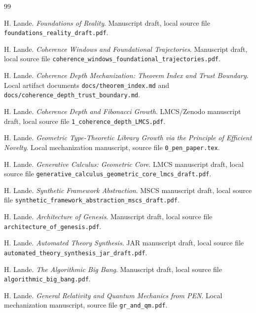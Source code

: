 \documentclass[11pt]{article}
\theoremstyle{plain}
\theoremstyle{definition}
\theoremstyle{remark}
\begin{document}
\begin{thebibliography}{99}
\raggedright

H. Lande.
\newblock \emph{Foundations of Reality}.
\newblock Manuscript draft, local source file \texttt{foundations\_reality\_draft.pdf}.

H. Lande.
\newblock \emph{Coherence Windows and Foundational Trajectories}.
\newblock Manuscript draft, local source file \texttt{coherence\_windows\_foundational\_trajectories.pdf}.

H. Lande.
\newblock \emph{Coherence Depth Mechanization: Theorem Index and Trust Boundary}.
\newblock Local artifact documents \texttt{docs/theorem\_index.md} and \texttt{docs/coherence\_depth\_trust\_boundary.md}.

H. Lande.
\newblock \emph{Coherence Depth and Fibonacci Growth}.
\newblock LMCS/Zenodo manuscript draft, local source file \texttt{1\_coherence\_depth\_LMCS.pdf}.

H. Lande.
\newblock \emph{Geometric Type-Theoretic Library Growth via the Principle of Efficient Novelty}.
\newblock Local mechanization manuscript, source file \texttt{0\_pen\_paper.tex}.

H. Lande.
\newblock \emph{Generative Calculus: Geometric Core}.
\newblock LMCS manuscript draft, local source file \texttt{generative\_calculus\_geometric\_core\_lmcs\_draft.pdf}.

H. Lande.
\newblock \emph{Synthetic Framework Abstraction}.
\newblock MSCS manuscript draft, local source file \texttt{synthetic\_framework\_abstraction\_mscs\_draft.pdf}.

H. Lande.
\newblock \emph{Architecture of Genesis}.
\newblock Manuscript draft, local source file \texttt{architecture\_of\_genesis.pdf}.

H. Lande.
\newblock \emph{Automated Theory Synthesis}.
\newblock JAR manuscript draft, local source file \texttt{automated\_theory\_synthesis\_jar\_draft.pdf}.

H. Lande.
\newblock \emph{The Algorithmic Big Bang}.
\newblock Manuscript draft, local source file \texttt{algorithmic\_big\_bang.pdf}.

H. Lande.
\newblock \emph{General Relativity and Quantum Mechanics from PEN}.
\newblock Local mechanization manuscript, source file \texttt{gr\_and\_qm.pdf}.


\end{thebibliography}
\end{document}
